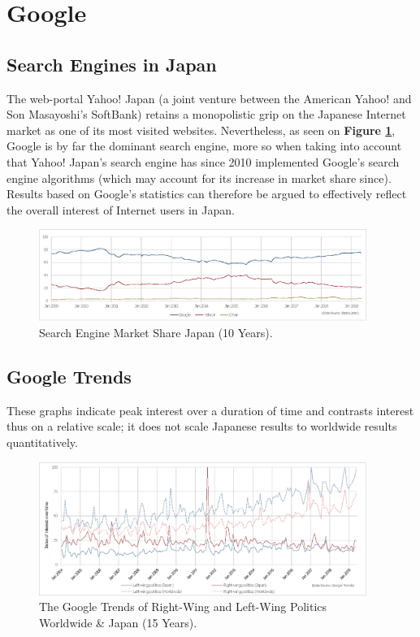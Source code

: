 \documentclass[10pt,british,A4paper,oneside]{memoir}
\begin{document}
\section{Google}\label{google}

\subsection{Search Engines in Japan}\label{search-engines-in-japan}

The web-portal Yahoo! Japan (a joint venture between the American Yahoo!
and Son Masayoshi's SoftBank) retains a monopolistic grip on the
Japanese Internet market as one of its most visited websites.
Nevertheless, as seen on \textbf{Figure \ref{fig:searchengine}}, Google
is by far the dominant search engine, more so when taking into account
that Yahoo! Japan's search engine has since 2010 implemented Google's
search engine algorithms (which may account for its increase in market
share since). Results based on Google's statistics can therefore be
argued to effectively reflect the overall interest of Internet users in
Japan.

\begin{figure}[!htb]
 \centering
 \caption{\label{fig:searchengine} Search Engine Market Share Japan (10 Years).}
 \includegraphics[width=0.95\textwidth,trim=4 4 4 4,clip]{images/searchengine.eps}
 \end{figure}

\subsection{Google Trends}\label{google-trends}

\label{appendix:googletrends}

These graphs indicate peak interest over a duration of time and
contrasts interest thus on a relative scale; it does not scale Japanese
results to worldwide results quantitatively.

\begin{figure}[!htb]
 \caption{\label{fig:politictrends} The Google Trends of Right-Wing and Left-Wing Politics Worldwide \& Japan (15 Years).}
 \centering 
 \includegraphics[width=0.95\textwidth,trim=4 4 4 4,clip]{images/politictrends.eps}
\end{figure}
\end{document}
